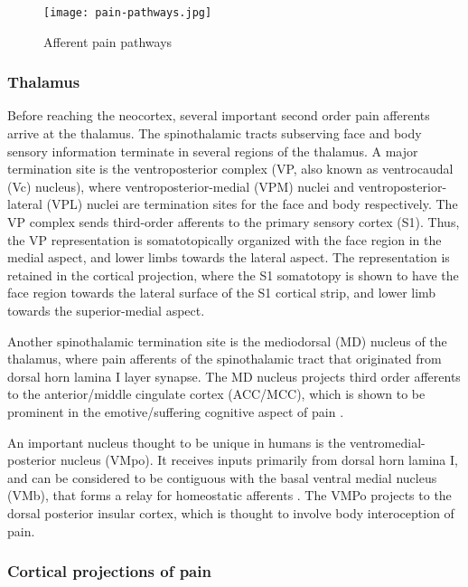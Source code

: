  \begin{figure}[ht]
 \texttt{[image: pain-pathways.jpg]}
 \centering
 \caption{Afferent pain pathways \protect\cite{kandel2000principles}}
 \label{fig:pain-pathways}
 \end{figure}
 
 
\subsubsection{Thalamus}

Before reaching the neocortex, several important second order pain afferents arrive at the thalamus. The spinothalamic tracts subserving face and body sensory information terminate in several regions of the thalamus. A major termination site is the ventroposterior complex (VP, also known as ventrocaudal (Vc) nucleus), where ventroposterior-medial (VPM) nuclei and ventroposterior-lateral (VPL) nuclei are termination sites for the face and body respectively. The VP complex sends third-order afferents to the primary sensory cortex (S1). Thus, the VP representation is somatotopically organized with the face region in the medial aspect, and lower limbs towards the lateral aspect. The representation is retained in the cortical projection, where the S1 somatotopy is shown to have the face region towards the lateral surface of the S1 cortical strip, and lower limb towards the superior-medial aspect. 

Another spinothalamic termination site is the mediodorsal (MD) nucleus of the thalamus, where pain afferents of the spinothalamic tract that originated from dorsal horn lamina I layer synapse. The MD nucleus projects third order afferents to the anterior/middle cingulate cortex (ACC/MCC), which is shown to be prominent in the emotive/suffering cognitive aspect of pain \cite{Vogt2016}.  

An important nucleus thought to be unique in humans is the ventromedial-posterior nucleus (VMpo)\cite{Willis2002,Craig2014}. It receives inputs primarily from dorsal horn lamina I, and can be considered to be contiguous with the basal ventral medial nucleus (VMb), that forms a relay for homeostatic afferents \cite{Craig2003}. The VMPo projects to the dorsal posterior insular cortex, which is thought to involve body interoception of pain.

\subsubsection{Cortical projections of pain}\label{section:neuromatrix}

